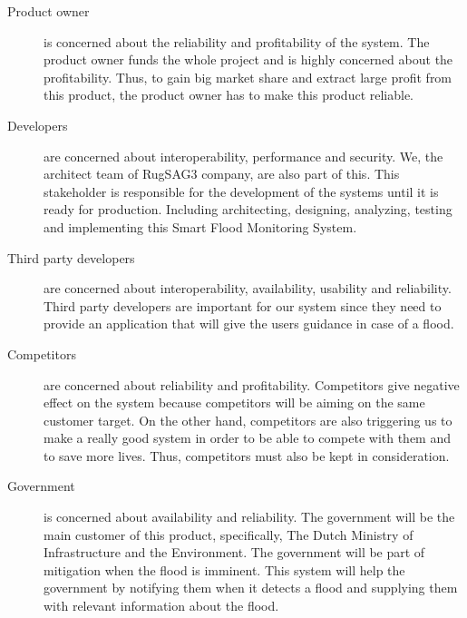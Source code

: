 
\begin{description}
\item[Product owner] is concerned about the reliability and profitability of the system. The product owner funds the whole project and is highly concerned about the profitability. Thus, to gain big market share and extract large profit from this product, the product owner has to make this product reliable.
 
\item[Developers] are concerned about interoperability, performance and security. We, the architect team of RugSAG3 company, are also part of this. This stakeholder is responsible for the development of the systems until it is ready for production. Including architecting, designing, analyzing, testing and implementing this Smart Flood Monitoring System.

\item[Third party developers] are concerned about interoperability, availability, usability and reliability. Third party developers are important for our system since they need to provide an application that will give the users guidance in case of a flood.

\item[Competitors] are concerned about reliability and profitability. Competitors give negative effect on the system because competitors will be aiming on the same customer target. On the other hand, competitors are also triggering us to make a really good system in order to be able to compete with them and to save more lives. Thus, competitors must also be kept in consideration.

\item[Government] is concerned about availability and reliability. The government will be the main customer of this product, specifically, The Dutch Ministry of Infrastructure and the Environment. The government will be part of mitigation when the flood is imminent. This system will help the government by notifying them when it detects a flood and supplying them with relevant information about the flood.


\end{description}
